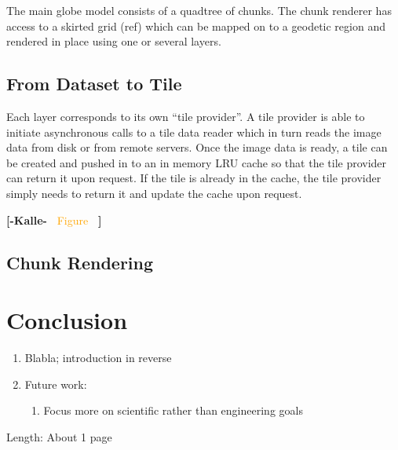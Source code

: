 \documentclass[journal]{vgtc}                %
\newcommand{\kallecomment}[1]{\textbf{[-Kalle-~}
    \textcolor{orange}{#1}
    \textbf{~]}}
\begin{document}
The main globe model consists of a quadtree of chunks.
The chunk renderer has access to a skirted grid (ref) which can be mapped on to a geodetic region and rendered in place using one or several layers.

\subsection{From Dataset to Tile}

Each layer corresponds to its own ``tile provider''.
A tile provider is able to initiate asynchronous calls to a tile data reader which in turn reads the image data from disk or from remote servers.
Once the image data is ready, a tile can be created and pushed in to an in memory LRU cache so that the tile provider can return it upon request.
If the tile is already in the cache, the tile provider simply needs to return it and update the cache upon request.

\kallecomment{Figure}

\subsection{Chunk Rendering}




\section{Conclusion} \label{sec:system}
\begin{enumerate}
  \item Blabla; introduction in reverse
  \item Future work:
  \begin{enumerate}
    \item Focus more on scientific rather than engineering goals
  \end{enumerate}
\end{enumerate}
Length: About 1 page


%

%
%
%


\end{document}
